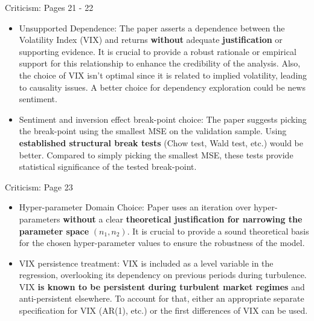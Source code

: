 \documentclass{beamer}
\begin{document}
\begin{frame}{Criticism: Pages 21 - 22}
    \begin{itemize}
        \item Unsupported Dependence: The paper asserts a dependence between the Volatility Index (VIX) and returns \textbf{without} adequate \textbf{justification} or supporting evidence. It is crucial to provide a robust rationale or empirical support for this relationship to enhance the credibility of the analysis. Also, the choice of VIX isn't optimal since it is related to implied volatility, leading to causality issues. A better choice for dependency exploration could be news sentiment.

        \item Sentiment and inversion effect break-point choice: The paper suggests picking the break-point using the smallest MSE on the validation sample. Using \textbf{established structural break tests} (Chow test, Wald test, etc.) would be better. Compared to simply picking the smallest MSE, these tests provide statistical significance of the tested break-point.
    \end{itemize}
\end{frame}

\begin{frame}{Criticism: Page 23}
    \begin{itemize}
        
        \item Hyper-parameter Domain Choice: Paper uses an iteration over hyper-parameters \textbf{without} a clear \textbf{theoretical justification for narrowing the parameter space} $(n_1, n_2)$. It is crucial to provide a sound theoretical basis for the chosen hyper-parameter values to ensure the robustness of the model.
        
        \item VIX persistence treatment: VIX is included as a level variable in the regression, overlooking its dependency on previous periods during turbulence. VIX \textbf{is known to be persistent during turbulent market regimes} and anti-persistent elsewhere. To account for that, either an appropriate separate specification for VIX (AR(1), etc.) or the first differences of VIX can be used.
    \end{itemize}
\end{frame}
\end{document}
